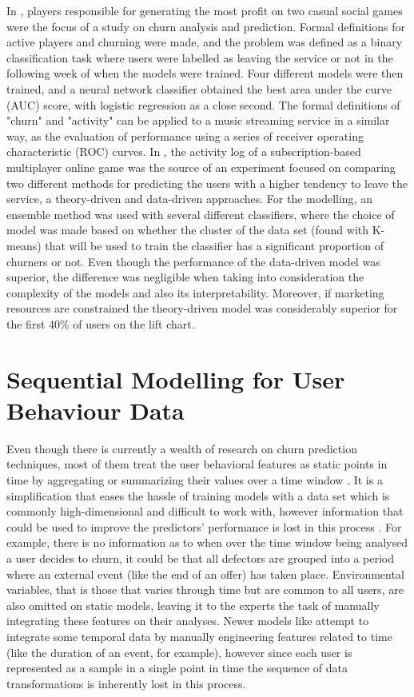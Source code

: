 \documentclass{kththesis}
\begin{document}
In \citep{Runge2014}, players responsible for generating the most profit on two casual social games were the focus of a study on churn analysis and prediction. Formal definitions for active players and churning were made, and the problem was defined as a binary classification task where users were labelled as leaving the service or not in the following week of when the models were trained. Four different models were then trained, and a neural network classifier obtained the best area under the curve (AUC) score, with logistic regression as a close second. The formal definitions of "churn" and "activity" can be applied to a music streaming service in a similar way, as the evaluation of performance using a series of receiver operating characteristic (ROC) curves. In \citep{Borbora2011}, the activity log of a subscription-based multiplayer online game was the source of an experiment focused on comparing two different methods for predicting the users with a higher tendency to leave the service, a theory-driven and data-driven approaches. For the modelling, an ensemble method was used with several different classifiers, where the choice of model was made based on whether the cluster of the data set (found with K-means) that will be used to train the classifier has a significant proportion of churners or not. Even though the performance of the data-driven model was superior, the difference was negligible when taking into consideration the complexity of the models and also its interpretability. Moreover, if marketing resources are constrained the theory-driven model was considerably superior for the first 40\% of users on the lift chart. 


\section{Sequential Modelling for User Behaviour Data}

Even though there is currently a wealth of research on churn prediction techniques, most of them treat the user behavioral features as static points in time by aggregating or summarizing their values over a time window \citep{Auon2015}. It is a simplification that eases the hassle of training models with a data set which is commonly high-dimensional and difficult to work with, however information that could be used to improve the predictors' performance is lost in this process  \citep{GurAli2014}. For example, there is no information as to when over the time window being analysed a user decides to churn, it could be that all defectors are grouped into a period where an external event (like the end of an offer) has taken place. Environmental variables, that is those that varies through time but are common to all users, are also omitted on static models, leaving it to the experts the task of manually integrating these features on their analyses. Newer models like \citep{Pudipeddi2014} attempt to integrate some temporal data by manually engineering features related to time (like the duration of an event, for example), however since each user is represented as a sample in a single point in time the sequence of data transformations is inherently lost in this process.
\end{document}
